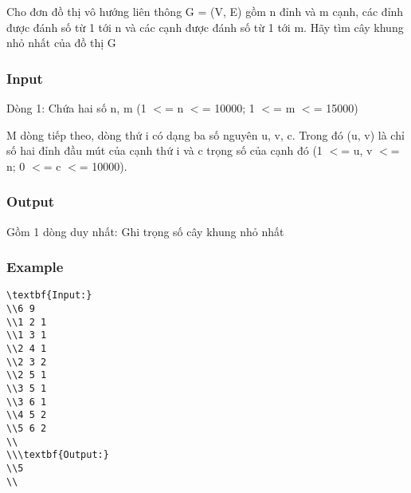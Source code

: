 



   Cho đơn đồ thị vô hướng liên thông G = (V, E) gồm n đỉnh và m cạnh, các đỉnh được đánh số từ 1 tới n và các cạnh được đánh số từ 1 tới m. Hãy tìm cây khung nhỏ nhất của đồ thị G  

\subsubsection{   Input  }

   Dòng 1: Chứa hai số n, m (1 $<$= n $<$= 10000; 1 $<$= m $<$= 15000)  

   M dòng tiếp theo, dòng thứ i có dạng ba số nguyên u, v, c. Trong đó (u, v) là chỉ số hai đỉnh đầu mút của cạnh thứ i và c trọng số của cạnh đó (1 $<$= u, v $<$= n; 0 $<$= c $<$= 10000).  

\subsubsection{   Output  }

   Gồm 1 dòng duy nhất: Ghi trọng số cây khung nhỏ nhất  

\subsubsection{   Example  }
\begin{verbatim}
\textbf{Input:}
\\6 9
\\1 2 1
\\1 3 1
\\2 4 1
\\2 3 2
\\2 5 1
\\3 5 1
\\3 6 1
\\4 5 2
\\5 6 2
\\
\\\textbf{Output:}
\\5
\\\end{verbatim}